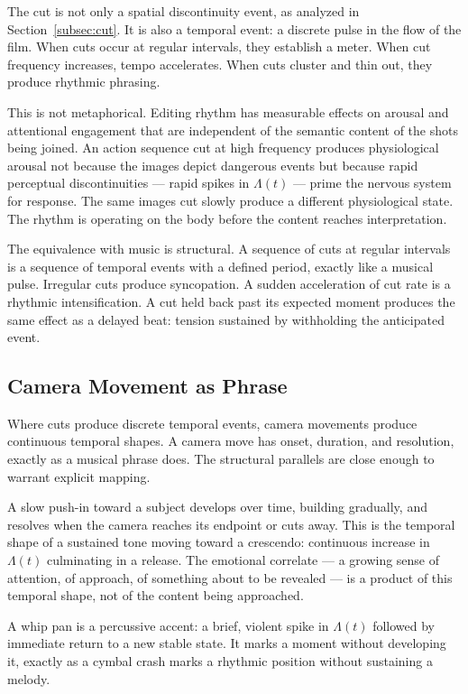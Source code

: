 \documentclass[12pt, a4paper]{article}
\theoremstyle{plain}
\theoremstyle{definition}
\theoremstyle{remark}
\begin{document}
The cut is not only a spatial discontinuity event, as
analyzed in Section~\ref{subsec:cut}. It is also a temporal
event: a discrete pulse in the flow of the film. When cuts
occur at regular intervals, they establish a meter. When cut
frequency increases, tempo accelerates. When cuts cluster and
thin out, they produce rhythmic phrasing.

This is not metaphorical. Editing rhythm has measurable
effects on arousal and attentional engagement that are
independent of the semantic content of the shots being
joined. An action sequence cut at high frequency produces
physiological arousal not because the images depict
dangerous events but because rapid perceptual
discontinuities --- rapid spikes in $\Lambda(t)$ --- prime
the nervous system for response. The same images cut slowly
produce a different physiological state. The rhythm is
operating on the body before the content reaches
interpretation.

The equivalence with music is structural. A sequence of cuts
at regular intervals is a sequence of temporal events with a
defined period, exactly like a musical pulse. Irregular cuts
produce syncopation. A sudden acceleration of cut rate is a
rhythmic intensification. A cut held back past its expected
moment produces the same effect as a delayed beat: tension
sustained by withholding the anticipated event.

\subsection{Camera Movement as Phrase}
\label{subsec:phrase}

Where cuts produce discrete temporal events, camera
movements produce continuous temporal shapes. A camera move
has onset, duration, and resolution, exactly as a musical
phrase does. The structural parallels are close enough to
warrant explicit mapping.

A slow push-in toward a subject develops over time, building
gradually, and resolves when the camera reaches its endpoint
or cuts away. This is the temporal shape of a sustained tone
moving toward a crescendo: continuous increase in $\Lambda(t)$
culminating in a release. The emotional correlate --- a
growing sense of attention, of approach, of something about
to be revealed --- is a product of this temporal shape, not
of the content being approached.

A whip pan is a percussive accent: a brief, violent spike in
$\Lambda(t)$ followed by immediate return to a new stable
state. It marks a moment without developing it, exactly as a
cymbal crash marks a rhythmic position without sustaining a
melody.
\end{document}

